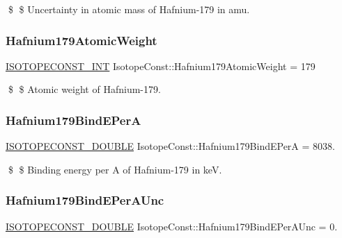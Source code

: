 \$ \$ Uncertainty in atomic mass of Hafnium-\/179 in amu. \mbox{\label{group___isotope_const-_hafnium-_hf179_ga197a56aae65c02bbe302bf0724be341d}} 
\subsubsection{\texorpdfstring{Hafnium179\+Atomic\+Weight}{Hafnium179AtomicWeight}}
{\footnotesize\ttfamily \mbox{\hyperlink{group___isotope_const-_macros_ga5f18360b3e99483a35c32d789e62621c}{I\+S\+O\+T\+O\+P\+E\+C\+O\+N\+S\+T\+\_\+\+I\+NT}} Isotope\+Const\+::\+Hafnium179\+Atomic\+Weight = 179}

\$ \$ Atomic weight of Hafnium-\/179. \mbox{\label{group___isotope_const-_hafnium-_hf179_ga7ad665e5e849139772d1a5cb6730968f}} 
\subsubsection{\texorpdfstring{Hafnium179\+Bind\+E\+PerA}{Hafnium179BindEPerA}}
{\footnotesize\ttfamily \mbox{\hyperlink{group___isotope_const-_macros_ga8f45a7272ce02c0b4c65c44636ed719a}{I\+S\+O\+T\+O\+P\+E\+C\+O\+N\+S\+T\+\_\+\+D\+O\+U\+B\+LE}} Isotope\+Const\+::\+Hafnium179\+Bind\+E\+PerA = 8038.}

\$ \$ Binding energy per A of Hafnium-\/179 in keV. \mbox{\label{group___isotope_const-_hafnium-_hf179_ga7f4826d31554ab720796807ffe0480f8}} 
\subsubsection{\texorpdfstring{Hafnium179\+Bind\+E\+Per\+A\+Unc}{Hafnium179BindEPerAUnc}}
{\footnotesize\ttfamily \mbox{\hyperlink{group___isotope_const-_macros_ga8f45a7272ce02c0b4c65c44636ed719a}{I\+S\+O\+T\+O\+P\+E\+C\+O\+N\+S\+T\+\_\+\+D\+O\+U\+B\+LE}} Isotope\+Const\+::\+Hafnium179\+Bind\+E\+Per\+A\+Unc = 0.}

